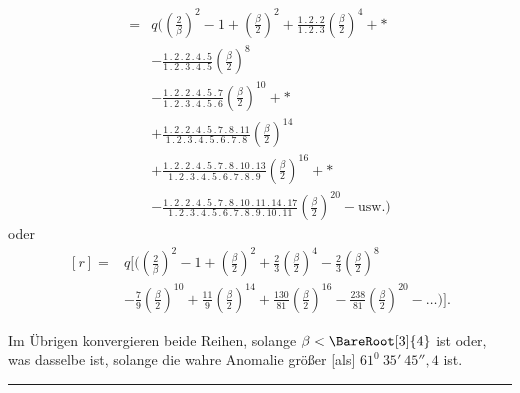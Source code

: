\[
\begin{aligned}
={}&q\Biggl(\left(\frac2\beta\right)^2-1+\left(\frac\beta2\right)^2
+\frac{1\mathpunct{.}2\mathpunct{.}2}{1\mathpunct{.}2\mathpunct{.}3}\left(\frac\beta2\right)^4+\ast\\
&-\frac{1\mathpunct{.}2\mathpunct{.}2\mathpunct{.}4\mathpunct{.}5}{1\mathpunct{.}2\mathpunct{.}3\mathpunct{.}4\mathpunct{.}5}\left(\frac\beta2\right)^8\\
&-\frac{1\mathpunct{.}2\mathpunct{.}2\mathpunct{.}4\mathpunct{.}5\mathpunct{.}7}{1\mathpunct{.}2\mathpunct{.}3\mathpunct{.}4\mathpunct{.}5\mathpunct{.}6}\left(\frac\beta2\right)^{10}+\ast\\
&+\frac{1\mathpunct{.}2\mathpunct{.}2\mathpunct{.}4\mathpunct{.}5\mathpunct{.}7\mathpunct{.}8\mathpunct{.}11}{1\mathpunct{.}2\mathpunct{.}3\mathpunct{.}4\mathpunct{.}5\mathpunct{.}6\mathpunct{.}7\mathpunct{.}8}\left(\frac\beta2\right)^{14}\\
&+\frac{1\mathpunct{.}2\mathpunct{.}2\mathpunct{.}4\mathpunct{.}5\mathpunct{.}7\mathpunct{.}8\mathpunct{.}10\mathpunct{.}13}{1\mathpunct{.}2\mathpunct{.}3\mathpunct{.}4\mathpunct{.}5\mathpunct{.}6\mathpunct{.}7\mathpunct{.}8\mathpunct{.}9}\left(\frac\beta2\right)^{16}+\ast\\
&-\frac{1\mathpunct{.}2\mathpunct{.}2\mathpunct{.}4\mathpunct{.}5\mathpunct{.}7\mathpunct{.}8\mathpunct{.}10\mathpunct{.}11\mathpunct{.}14\mathpunct{.}17}{1\mathpunct{.}2\mathpunct{.}3\mathpunct{.}4\mathpunct{.}5\mathpunct{.}6\mathpunct{.}7\mathpunct{.}8\mathpunct{.}9\mathpunct{.}10\mathpunct{.}11}\left(\frac\beta2\right)^{20}-\text{usw.}\Biggr)
\end{aligned}
\]
oder
\[
\begin{aligned}
[r]={}&q\Biggl[\Biggl(\left(\frac2\beta\right)^2-1+\left(\frac\beta2\right)^2
+\frac23\left(\frac\beta2\right)^4-\frac23\left(\frac\beta2\right)^8\\
&-\frac79\left(\frac\beta2\right)^{10}+\frac{11}{9}\left(\frac\beta2\right)^{14}+\frac{130}{81}\left(\frac\beta2\right)^{16}
-\frac{238}{81}\left(\frac\beta2\right)^{20}-\ldots\Biggr)\Biggr].
\end{aligned}
\]
\par
Im Übrigen konvergieren beide Reihen, solange \(\beta<\BareRoot[3]{4}\) ist oder, was dasselbe ist, solange die wahre Anomalie größer [als] \(61^0\ 35'\ 45''{,}4\) ist.
\par\medskip
\begin{center}\rule{.18\textwidth}{.35pt}\end{center}
